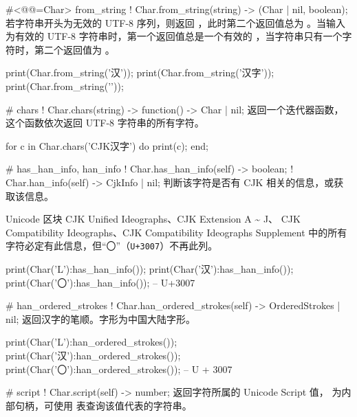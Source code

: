 \documentclass[class=article,doc={kv-usage}]{cusdoc}
\begin{document}
\begin{luadoc*}{}
#<@@=Char> from_string
! Char.from_string(string) -> (Char | nil, boolean);
若字符串开头为无效的 UTF-8 序列，则返回 ，此时第二个返回值总为 。当输入为有效的 UTF-8 字符串时，第一个返回值总是一个有效的 ，当字符串只有一个字符时，第二个返回值为 。
\end{luadoc*}

\begin{luarun}{}
print(Char.from_string('汉'));
print(Char.from_string('汉字'));
print(Char.from_string('\xFF'));
\end{luarun}

\begin{luadoc*}{}
# chars
! Char.chars(string) -> function() -> Char | nil;
返回一个迭代器函数，这个函数依次返回 UTF-8 字符串的所有字符。
\end{luadoc*}

\begin{luarun}{}
for c in Char.chars('CJK汉字') do
    print(c);
end;
\end{luarun}

\begin{luadoc*}{}
# has_han_info, han_info
! Char.has_han_info(self) -> boolean;
! Char.han_info(self) -> CjkInfo | nil;
判断该字符是否有 CJK 相关的信息，或获取该信息。

Unicode 区块 CJK Unified Ideographs、CJK Extension A \~{} J、
CJK Compatibility Ideographs、CJK Compatibility Ideographs Supplement
中的所有字符必定有此信息，但“〇”（\texttt{U+3007}）不再此列。
\end{luadoc*}

\begin{luarun}{}
print(Char('L'):has_han_info());
print(Char('汉'):has_han_info());
print(Char('〇'):has_han_info()); -- U+3007
\end{luarun}

\begin{luadoc*}{}
# han_ordered_strokes
! Char.han_ordered_strokes(self) -> OrderedStrokes | nil;
返回汉字的笔顺。字形为中国大陆字形。
\end{luadoc*}

\begin{luarun}{}
print(Char('L'):han_ordered_strokes());
print(Char('汉'):han_ordered_strokes());
print(Char('〇'):han_ordered_strokes()); -- U + 3007
\end{luarun}

\begin{luadoc*}{}
# script
! Char.script(self) -> number;
返回字符所属的 Unicode Script 值， 为内部句柄，可使用  表查询该值代表的字符串。
\end{luadoc*}
\end{document}
